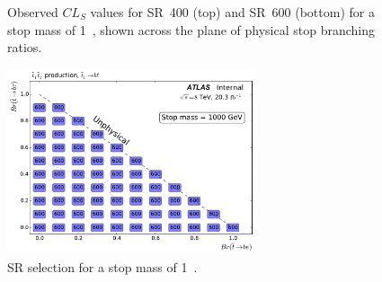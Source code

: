 \begin{figure}[ht]
  \centering
  \caption{
    Observed
    $CL_S$ values for SR~400 (top) and SR~600 (bottom) for a stop mass of
    1~\TeV,
    shown across the plane of physical stop branching ratios.
  }
\end{figure}

\begin{figure}[ht]
  \centering
  \includegraphics[width=0.65\textwidth]
    {figs/blstop/region_selection/region_choice_vs_br_m_1000.pdf}
  \caption{
    SR selection for a stop mass of 1~\TeV.
  }
\end{figure}

